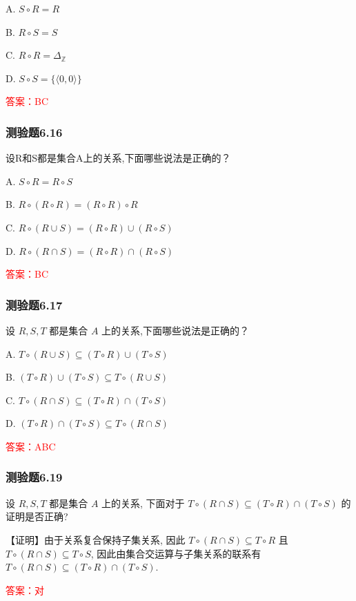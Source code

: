 \documentclass[UTF8, heading=true]{ctexart}
\begin{document}
A. $S \circ R=R$

B. $R \circ S=S$

C. $R \circ R=\Delta_{\mathbb{Z}}$

D. $S \circ S=\{\langle 0,0\rangle\}$

\textcolor{red}{答案：BC}

\subsubsection{测验题6.16}

设R和S都是集合A上的关系,下面哪些说法是正确的？

A. $S \circ R=R \circ S$

B. $R \circ(R \circ R)=(R \circ R) \circ R$

C. $R \circ(R \cup S)=(R \circ R) \cup(R \circ S)$

D. $R \circ(R \cap S)=(R \circ R) \cap(R \circ S)$

\textcolor{red}{答案：BC}



\subsubsection{测验题6.17}

设 $R, S, T$ 都是集合 $A$ 上的关系,下面哪些说法是正确的？

A. $T \circ (R \cup S) \subseteq (T \circ R) \cup (T \circ S)$

B. $ (T \circ R) \cup (T \circ S) \subseteq T \circ (R \cup S)$

C. $T \circ (R \cap S) \subseteq (T \circ R) \cap (T \circ S)$

D. $(T \circ R) \cap (T \circ S) \subseteq T \circ (R \cap S)$


\textcolor{red}{答案：ABC}

\subsubsection{测验题6.19}

设 $R, S, T$ 都是集合 $A$ 上的关系, 下面对于 $T \circ(R \cap S) \subseteq(T \circ R) \cap(T \circ S)$ 的证明是否正确?

【证明】由于关系复合保持子集关系, 因此 $T \circ(R \cap S) \subseteq T \circ R$ 且 $T \circ(R \cap S) \subseteq T \circ S$, 因此由集合交运算与子集关系的联系有 $T \circ(R \cap S) \subseteq(T \circ R) \cap(T \circ S)$.

\textcolor{red}{答案：对}
\end{document}
